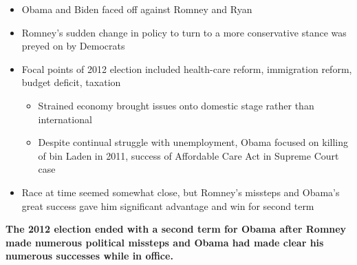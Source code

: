 \documentclass[a4paper]{article}
\begin{document}
        {
            \begin{itemize}
                \item Obama and Biden faced off against Romney and Ryan
                \item Romney's sudden change in policy to turn to a more conservative stance was preyed on by Democrats
                \item Focal points of 2012 election included health-care reform, immigration reform, budget deficit, taxation
                \begin{itemize}
                    \item Strained economy brought issues onto domestic stage rather than international
                    \item Despite continual struggle with unemployment, Obama focused on killing of bin Laden in 2011, success of Affordable Care Act in Supreme Court case
                \end{itemize}
                \item Race at time seemed somewhat close, but Romney's missteps and Obama's great success gave him significant advantage and win for second term
            \end{itemize}
            \textbf{The 2012 election ended with a second term for Obama after Romney made numerous political missteps and Obama had made clear his numerous successes while in office.}
        }
\end{document}
